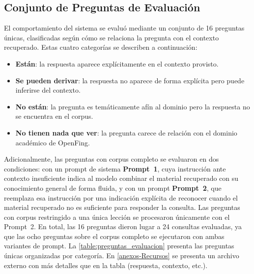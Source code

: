 \subsection{Conjunto de Preguntas de Evaluación}
\label{subsection:6-QA-Preguntas}
El comportamiento del sistema se evaluó mediante un conjunto de 16 preguntas únicas, clasificadas según cómo se relaciona la pregunta con el contexto recuperado. Estas cuatro categorías se describen a continuación:

\begin{itemize}
  \item \textbf{Están}: la respuesta aparece explícitamente en el contexto provisto.
  \item \textbf{Se pueden derivar}: la respuesta no aparece de forma explícita pero puede inferirse del contexto.
  \item \textbf{No están}: la pregunta es temáticamente afín al dominio pero la respuesta no se encuentra en el corpus.
  \item \textbf{No tienen nada que ver}: la pregunta carece de relación con el dominio académico de OpenFing.
\end{itemize}

Adicionalmente, las preguntas con corpus completo se evaluaron en dos condiciones: con un prompt de sistema \textbf{Prompt~1}, cuya instrucción ante contexto insuficiente indica al modelo combinar el material recuperado con su conocimiento general de forma fluida, y con un prompt \textbf{Prompt~2}, que reemplaza esa instrucción por una indicación explícita de reconocer cuando el material recuperado no es suficiente para responder la consulta. Las preguntas con corpus restringido a una única lección se procesaron únicamente con el Prompt~2. En total, las 16 preguntas dieron lugar a 24 consultas evaluadas, ya que las ocho preguntas sobre el corpus completo se ejecutaron con ambas variantes de prompt. La \autoref{table:preguntas_evaluacion} presenta las preguntas únicas organizadas por categoría. En \autoref{anexos-Recursos} se presenta un archivo externo con más detalles que en la tabla (respuesta, contexto, etc.).

